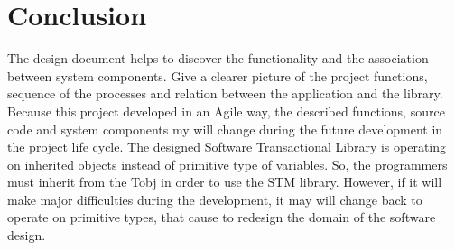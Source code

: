 \documentclass[12pt]{article}
\begin{document}
\section{Conclusion}
The design document helps to discover the functionality and the association between system components. Give a clearer picture of the project functions, sequence of the processes and relation between the application and the library.\\

Because this project developed in an Agile way, the described functions, source code and system components my will change during the future development in the project life cycle. The designed Software Transactional Library is operating on inherited objects instead of primitive type of variables. So, the programmers must inherit from the Tobj in order to use the STM library. However, if it will make major difficulties during the development, it may will change back to operate on primitive types, that cause to redesign the domain of the software design.  
\end{document}
